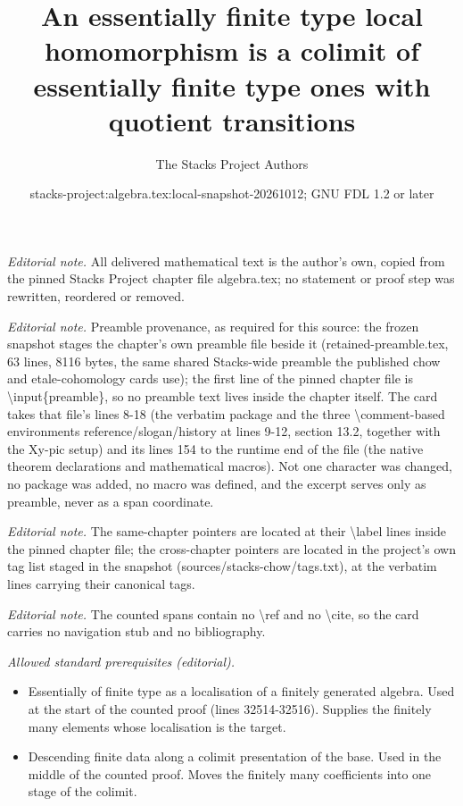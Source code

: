 \documentclass[10pt,a4paper]{amsart}
\title{An essentially finite type local homomorphism is a colimit of essentially finite type ones with quotient transitions}
\author{The Stacks Project Authors}
\date{stacks-project:algebra.tex:local-snapshot-20261012; GNU FDL 1.2 or later}
\theoremstyle{plain}
\theoremstyle{definition}
\theoremstyle{remark}
\numberwithin{equation}{subsection}
\begin{document}
\maketitle
\noindent\textit{Editorial note.} All delivered mathematical text is the author's own, copied from the pinned Stacks Project chapter file algebra.tex; no statement or proof step was rewritten, reordered or removed.\par\medskip
\noindent\textit{Editorial note.} Preamble provenance, as required for this source: the frozen snapshot stages the chapter's own preamble file beside it (retained-preamble.tex, 63 lines, 8116 bytes, the same shared Stacks-wide preamble the published chow and etale-cohomology cards use); the first line of the pinned chapter file is \textbackslash{}input\{preamble\}, so no preamble text lives inside the chapter itself. The card takes that file's lines 8-18 (the verbatim package and the three \textbackslash{}comment-based environments reference/slogan/history at lines 9-12, section 13.2, together with the Xy-pic setup) and its lines 154 to the runtime end of the file (the native theorem declarations and mathematical macros). Not one character was changed, no package was added, no macro was defined, and the excerpt serves only as preamble, never as a span coordinate.\par\medskip
\noindent\textit{Editorial note.} The same-chapter pointers are located at their \textbackslash{}label lines inside the pinned chapter file; the cross-chapter pointers are located in the project's own tag list staged in the snapshot (sources/stacks-chow/tags.txt), at the verbatim lines carrying their canonical tags.\par\medskip
\noindent\textit{Editorial note.} The counted spans contain no \textbackslash{}ref and no \textbackslash{}cite, so the card carries no navigation stub and no bibliography.\par\medskip
\noindent\textit{Allowed standard prerequisites (editorial).}\begin{itemize}
\item Essentially of finite type as a localisation of a finitely generated algebra. Used at the start of the counted proof (lines 32514-32516). Supplies the finitely many elements whose localisation is the target.
\item Descending finite data along a colimit presentation of the base. Used in the middle of the counted proof. Moves the finitely many coefficients into one stage of the colimit.
\end{itemize}\medskip
\end{document}
